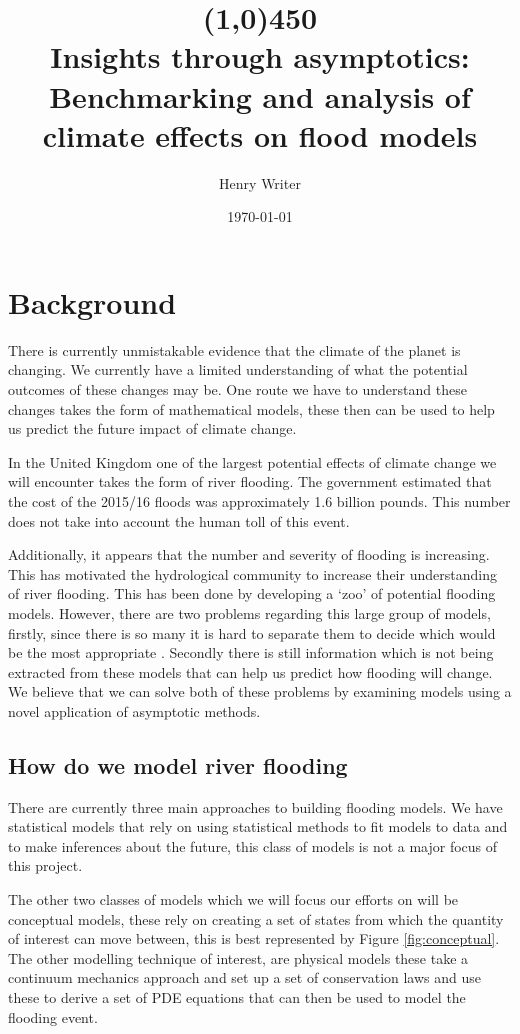 \documentclass[11pt]{article}
\title{\line(1,0){450} \\ \Huge\textbf{Insights through asymptotics:}\\
 \LARGE Benchmarking and analysis of climate effects on flood models}
\author{Henry Writer }
\date{\monthyeardate\today}
\begin{document}
\maketitle

\section{Background}

There is currently unmistakable evidence that the climate of the planet is changing. We currently have a limited understanding of what the potential outcomes of these changes may be. One route we have to understand these changes takes the form of mathematical models, these then can be used to help us predict the future impact of climate change.

In the United Kingdom one of the largest potential effects of climate change we will encounter takes the form of river flooding. The government estimated that the cost of the 2015/16 floods was approximately 1.6 billion pounds. This number does not take into account the human toll of this event. 


Additionally, it appears that the number and severity of flooding is increasing. This has motivated the hydrological community to increase their understanding of river flooding. This has been done by developing a `zoo' of potential flooding models. However, there are two problems regarding this large group of models, firstly, since there is so many it is hard to separate them to decide which would be the most appropriate \cite{neelz2013benchmarking}. 
Secondly there is still information which is not being extracted from these models that can help us predict how flooding will change. We believe that we can solve both of these problems by examining models using a novel application of asymptotic methods.


\subsection{How do we model river flooding}
There are currently three main approaches to building flooding models. We have statistical models that rely on using statistical methods to fit models to data and to make inferences about the future, this class of models is not a major focus of this project. 

The other two classes of models which we will focus our efforts on will be conceptual models, these rely on creating a set of states from which the quantity of interest can move between, this is best represented by Figure \ref{fig:conceptual}. 
The other modelling technique of interest, are physical models these take a continuum mechanics approach and set up a set of conservation laws and use these to derive a set of PDE equations that can then be used to model the flooding event.
\end{document}
